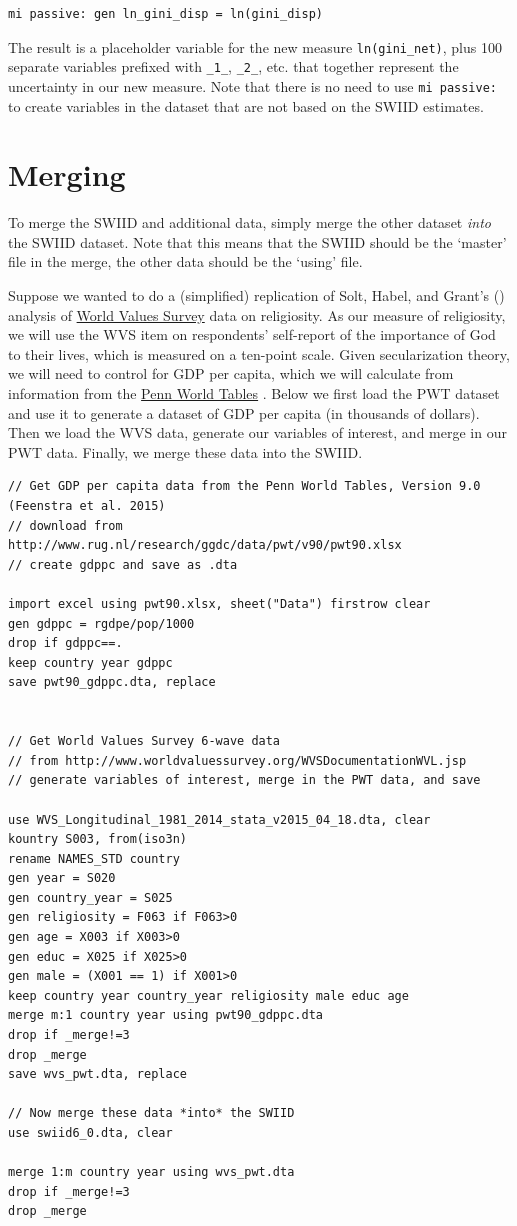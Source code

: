 \documentclass[11pt]{article}
\begin{document}
\begin{verbatim}
mi passive: gen ln_gini_disp = ln(gini_disp)
\end{verbatim}

The result is a placeholder variable for the new measure \verb+ln(gini_net)+, plus 100 separate variables prefixed with \verb+_1_+, \verb+_2_+, etc. that together represent the uncertainty in our new measure.  Note that there is no need to use \verb+mi passive:+ to create variables in the dataset that are not based on the SWIID estimates.

\section{Merging}
To merge the SWIID and additional data, simply merge the other dataset \emph{into} the SWIID dataset.  Note that this means that the SWIID should be the `master' file in the merge, the other data should be the `using' file. 

Suppose we wanted to do a (simplified) replication of Solt, Habel, and Grant's (\citeyear{Solt2011a}) analysis of \href{http://worldvaluessurvey.org}{World Values Survey} data on religiosity.  As our measure of religiosity, we will use the WVS item on respondents' self-report of the importance of God to their lives, which is measured on a ten-point scale.  Given secularization theory, we will need to control for GDP per capita, which we will calculate from information from the \href{www.ggdc.net/pwt}{Penn World Tables} \citep{Feenstra2015}.  Below we first load the PWT dataset and use it to generate a dataset of GDP per capita (in thousands of dollars).  Then we load the WVS data, generate our variables of interest, and merge in our PWT data.  Finally, we merge these data into the SWIID.

\begin{verbatim}
// Get GDP per capita data from the Penn World Tables, Version 9.0 (Feenstra et al. 2015)
// download from http://www.rug.nl/research/ggdc/data/pwt/v90/pwt90.xlsx
// create gdppc and save as .dta

import excel using pwt90.xlsx, sheet("Data") firstrow clear
gen gdppc = rgdpe/pop/1000
drop if gdppc==.
keep country year gdppc
save pwt90_gdppc.dta, replace


// Get World Values Survey 6-wave data 
// from http://www.worldvaluessurvey.org/WVSDocumentationWVL.jsp
// generate variables of interest, merge in the PWT data, and save

use WVS_Longitudinal_1981_2014_stata_v2015_04_18.dta, clear
kountry S003, from(iso3n)
rename NAMES_STD country
gen year = S020
gen country_year = S025 
gen religiosity = F063 if F063>0
gen age = X003 if X003>0
gen educ = X025 if X025>0
gen male = (X001 == 1) if X001>0
keep country year country_year religiosity male educ age
merge m:1 country year using pwt90_gdppc.dta
drop if _merge!=3
drop _merge
save wvs_pwt.dta, replace

// Now merge these data *into* the SWIID
use swiid6_0.dta, clear

merge 1:m country year using wvs_pwt.dta
drop if _merge!=3
drop _merge

\end{verbatim}
\end{document}
